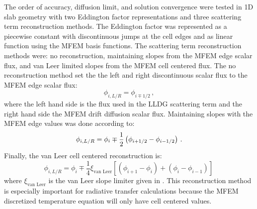 
The order of accuracy, diffusion limit, and solution convergence were tested in 1D slab geometry with two Eddington factor representations and three scattering term reconstruction methods. The Eddington factor was represented as a piecewise constant with discontinuous jumps at the cell edges and as linear function using the MFEM basis functions. The scattering term reconstruction methods were: no reconstruction, maintaining slopes from the MFEM edge scalar flux, and van Leer limited slopes from the MFEM cell centered flux. The no reconstruction method set the the left and right discontinuous scalar flux to the MFEM edge scalar flux:
	\begin{equation} 
		\phi_{i,L/R} = \phi_{i\mp1/2} \,,
	\end{equation}
where the left hand side is the flux used in the LLDG scattering term and the right hand side the MFEM drift diffusion scalar flux. 
Maintaining slopes with the MFEM edge values was done according to: 
	\begin{equation} \label{eq:edgeReconstruction}
		\phi_{i,L/R} = \phi_i \mp \frac{1}{2}\left(\phi_{i+1/2} - \phi_{i-1/2}\right) \,.
	\end{equation}
Finally, the van Leer cell centered reconstruction is: 
	\begin{equation} \label{eq:vanLeer}
		\phi_{i,L/R} = \phi_i \mp \frac{1}{4} \xi_\text{van Leer} \left[ \left(\phi_{i+1} - \phi_{i}\right) + 
			\left(\phi_{i} - \phi_{i-1}\right)\right] \,
	\end{equation}
where $\xi_\text{van Leer}$ is the van Leer slope limiter given in \cite{}. This reconstruction method is especially important for radiative transfer calculations because the MFEM discretized temperature equation will only have cell centered values. 

